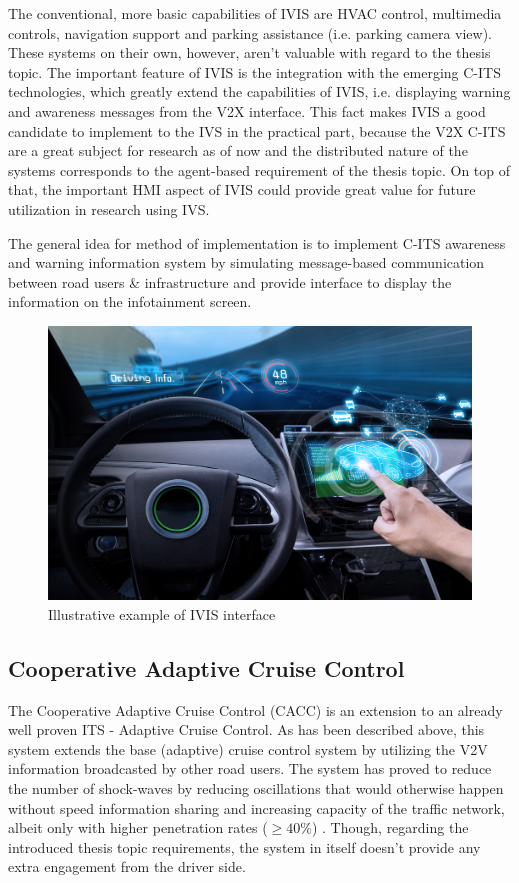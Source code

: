 \documentclass[main.tex]{subfiles}
\begin{document}
The conventional, more basic capabilities of IVIS are HVAC control, multimedia controls, navigation support and 
parking assistance (i.e. parking camera view). These systems on their own, however, aren't valuable with regard 
to the thesis topic. The important feature of IVIS is the integration with the emerging C-ITS technologies, which 
greatly extend the capabilities of IVIS, i.e. displaying warning and awareness messages from the V2X interface. 
This fact makes IVIS a good candidate to implement to the IVS in the practical part, because the V2X C-ITS are 
a great subject for research as of now and the distributed nature of the systems corresponds to the agent-based 
requirement of the thesis topic. On top of that, the important HMI aspect of IVIS could provide great value for 
future utilization in research using IVS. 

The general idea for method of implementation is to implement C-ITS awareness and warning information system by 
simulating message-based communication between road users \& infrastructure and provide interface to display the 
information on the infotainment screen.

\begin{figure}[htbp]
    \centering
    \includegraphics[width=.8\textwidth]{ivis-dashboard.jpg}
    \caption{Illustrative example of IVIS interface \cite{Saxena}}
    \label{ivis-interface}
\end{figure}

\subsection{Cooperative Adaptive Cruise Control}

The Cooperative Adaptive Cruise Control (CACC) is an extension to an already well proven ITS - Adaptive Cruise Control.
As has been described above, this system extends the base (adaptive) cruise control system by utilizing the V2V information broadcasted 
by other road users. The system has proved to reduce the number of shock-waves by reducing
oscillations that would otherwise happen without speed information sharing and increasing
capacity of the traffic network, albeit only with higher penetration rates ($\ge 40\%$)
\cite{van_Arem_2006}. Though, regarding the introduced thesis topic requirements, 
the system in itself doesn't provide any extra engagement from the driver side. 
\end{document}

